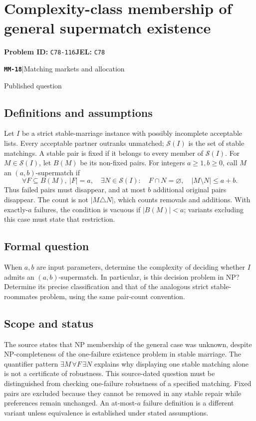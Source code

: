 \documentclass[11pt,a4paper]{article}
\newcommand{\entrymeta}[3]{{\sffamily\small\color{muted}\textbf{\texttt{#1}}\quad|\quad #2\par #3\par}}
\begin{document}
\section*{Complexity-class membership of general supermatch existence}
\textbf{Problem ID:} \texttt{C78-116}\quad \textbf{JEL:} \texttt{C78}\par
\label{problem:OP-0559}
\label{beyond:MM-18}
\entrymeta{MM-18}{Matching markets and allocation}{Published question}
\subsection*{Definitions and assumptions}
Let $I$ be a strict stable-marriage instance with possibly incomplete acceptable lists. Every acceptable partner outranks unmatched; $\mathcal S(I)$ is the set of stable matchings. A stable pair is fixed if it belongs to every member of $\mathcal S(I)$. For $M\in\mathcal S(I)$, let $B(M)$ be its non-fixed pairs. For integers $a\ge1,b\ge0$, call $M$ an $(a,b)$-supermatch if
\[
 \forall F\subseteq B(M),\ |F|=a,\quad
 \exists N\in\mathcal S(I):\quad
 F\cap N=\varnothing,\quad |M\setminus N|\le a+b.
\]
Thus failed pairs must disappear, and at most $b$ additional original pairs disappear. The count is not $|M\triangle N|$, which counts removals and additions. With exactly-$a$ failures, the condition is vacuous if $|B(M)|<a$; variants excluding this case must state that restriction.
\subsection*{Formal question}
When $a,b$ are input parameters, determine the complexity of deciding whether $I$ admits an $(a,b)$-supermatch. In particular, is this decision problem in NP? Determine its precise classification and that of the analogous strict stable-roommates problem, using the same pair-count convention.
\subsection*{Scope and status}
The source states that NP membership of the general case was unknown, despite NP-completeness of the one-failure existence problem in stable marriage. The quantifier pattern $\exists M\,\forall F\,\exists N$ explains why displaying one stable matching alone is not a certificate of robustness. This source-dated question must be distinguished from checking one-failure robustness of a specified matching. Fixed pairs are excluded because they cannot be removed in any stable repair while preferences remain unchanged. An at-most-$a$ failure definition is a different variant unless equivalence is established under stated assumptions.
\end{document}
